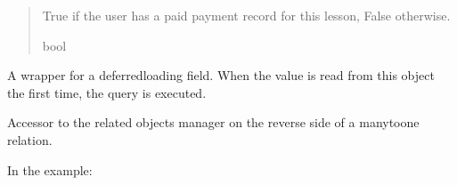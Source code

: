 \documentclass[letterpaper,10pt,english]{sphinxmanual}
\begin{document}
\begin{fulllineitems}
\begin{fulllineitems}
\begin{quote}
\begin{description}
\sphinxAtStartPar
True if the user has a paid payment record for this lesson, False otherwise.

\sphinxAtStartPar
bool

\end{description}\end{quote}

\end{fulllineitems}


\begin{fulllineitems}
\label{\detokenize{courses:id7}}
\pysigstartsignatures
\pysiglinewithargsret
{}
{}
{}
\pysigstopsignatures
\end{fulllineitems}


\begin{fulllineitems}
\label{\detokenize{courses:id8}}
\pysigstartsignatures
\pysigline
{}
\pysigstopsignatures
\sphinxAtStartPar
A wrapper for a deferred\sphinxhyphen{}loading field. When the value is read from this
object the first time, the query is executed.

\end{fulllineitems}


\begin{fulllineitems}
\label{\detokenize{courses:courses.models.Lesson.lessoncompletion_set}}
\pysigstartsignatures
\pysigline
{}
\pysigstopsignatures
\sphinxAtStartPar
Accessor to the related objects manager on the reverse side of a
many\sphinxhyphen{}to\sphinxhyphen{}one relation.

\sphinxAtStartPar
In the example:

\begin{sphinxVerbatim}[commandchars=\\\{\}]
       
\end{sphinxVerbatim}


\end{fulllineitems}
\end{fulllineitems}
\end{document}

